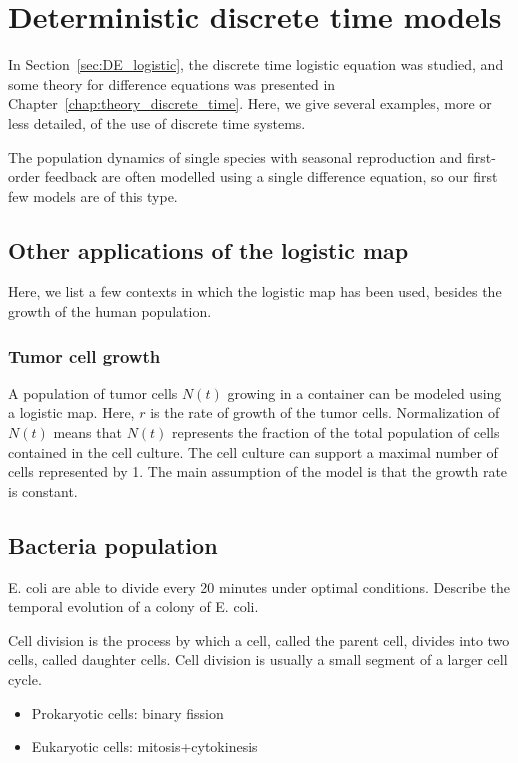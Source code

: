 \chapter{Deterministic discrete time models}

In Section~\ref{sec:DE_logistic}, the discrete time logistic equation was studied, and some theory for difference equations was presented in Chapter~\ref{chap:theory_discrete_time}. Here, we give several examples, more or less detailed, of the use of discrete time systems.

The population dynamics of single species with seasonal
reproduction and first-order feedback are often modelled
using a single difference equation, so our first few models are of this type.


\section{Other applications of the logistic map}
Here, we list a few contexts in which the logistic map has been used, besides the growth of the human population.
\subsection{Tumor cell growth}
A population of tumor cells $N(t)$ growing in a container can be modeled using a logistic map. Here, $r$ is the rate of growth of the tumor cells. Normalization of $N(t)$ means that $N(t)$ represents the fraction of the total population of cells contained in the cell culture. The cell culture can support a maximal number of cells represented by 1. The main assumption of the model is that the growth rate is constant.


\section{Bacteria population}
E. coli are able to divide every 20 minutes under optimal conditions. Describe the temporal evolution of a colony of E. coli.


\begin{definition}
Cell division is the process by which a cell, called the parent cell, divides into two cells, called daughter cells. Cell division is usually a small segment of a larger cell cycle.
\begin{itemize}
\item Prokaryotic cells: binary fission
\item Eukaryotic cells: mitosis+cytokinesis
\end{itemize}
\end{definition}

